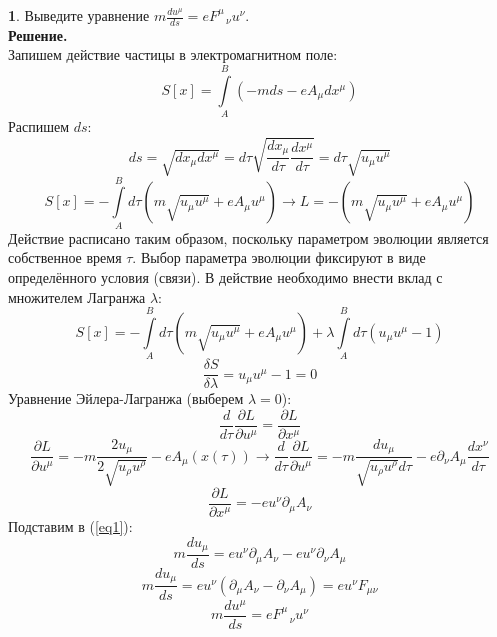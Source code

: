 \documentclass[12pt]{article}
\theoremstyle{definition}
\newtheorem{zad}{}[section]
\begin{document}
\begin{zad}
Выведите уравнение $m\frac{du^\mu}{ds}=eF^\mu_{\;\;\;\nu}u^\nu$.\\
\textbf{Решение.}\\
Запишем действие частицы в электромагнитном поле:
\begin{equation}
    S[x]=\int\limits_A^B(-mds-eA_\mu dx^\mu)
\end{equation}
Распишем $ds$:
\begin{equation}
    ds=\sqrt{dx_\mu dx^\mu}=d\tau\sqrt{\frac{dx_\mu}{d\tau}\frac{dx^\mu}{d\tau}}=d\tau\sqrt{u_\mu u^\mu}
\end{equation}
\begin{equation}
    S[x]=-\int\limits_A^Bd\tau(m\sqrt{u_\mu u^\mu}+eA_\mu u^\mu)\rightarrow L=-(m\sqrt{u_\mu u^\mu}+eA_\mu u^\mu)
\end{equation}
Действие расписано таким образом, поскольку параметром эволюции является собственное время $\tau$. Выбор параметра эволюции фиксируют в виде определённого условия (связи). В действие необходимо внести вклад с множителем Лагранжа $\lambda$:
\begin{equation}
    S[x]=-\int\limits_A^Bd\tau(m\sqrt{u_\mu u^\mu}+eA_\mu u^\mu)+\lambda\int\limits_A^Bd\tau(u_\mu u^\mu-1)
\end{equation}
\begin{equation}
    \frac{\delta S}{\delta \lambda}=u_\mu u^\mu-1=0
\end{equation}
Уравнение Эйлера-Лагранжа (выберем $\lambda=0$):
\begin{equation}\label{eq1}
    \frac{d}{d\tau}\frac{\partial L}{\partial u^\mu}=\frac{\partial L}{\partial x^\mu}
\end{equation}
\begin{equation}
    \frac{\partial L}{\partial u^\mu}=-m\frac{2u_\mu}{2\sqrt{u_\rho u^\rho}}-eA_\mu(x(\tau))\rightarrow\frac{d}{d\tau}\frac{\partial L}{\partial u^\mu}=-m\frac{du_\mu}{\sqrt{u_\rho u^\rho}d\tau}-e\partial_\nu A_\mu\frac{dx^\nu}{d\tau}
\end{equation}
\begin{equation}
    \frac{\partial L}{\partial x^\mu}=-eu^\nu\partial_\mu A_\nu
\end{equation}
Подставим в (\ref{eq1}):
\begin{equation}
    m\frac{du_\mu}{ds}=eu^\nu\partial_\mu A_\nu-eu^\nu\partial_\nu A_\mu
\end{equation}
\begin{equation}
    m\frac{du_\mu}{ds}=eu^\nu(\partial_\mu A_\nu-\partial_\nu A_\mu)=eu^\nu F_{\mu\nu}
\end{equation}
\begin{equation}
    \boxed{m\frac{du^\mu}{ds}=eF^\mu_{\;\;\;\nu}u^\nu}
\end{equation}
\end{zad}
\end{document}
